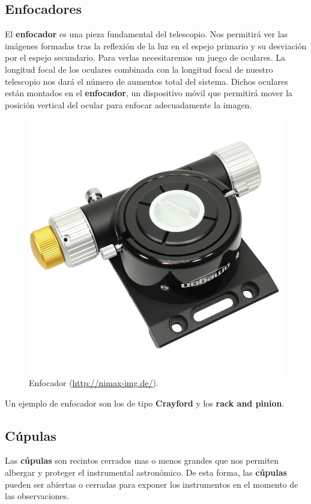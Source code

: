 \subsection{Enfocadores}

El \textbf{enfocador} es una pieza fundamental del telescopio. Nos permitirá ver las imágenes formadas tras la reflexión de la luz en el espejo primario y su desviación por el espejo secundario. Para verlas necesitaremos un juego de oculares. La longitud focal de los oculares combinada con la longitud focal de nuestro telescopio nos dará el número de aumentos total del sistema. Dichos oculares están montados en el \textbf{enfocador}, un dispositivo móvil que permitirá mover la posición vertical del ocular para enfocar adecuadamente la imagen.

\bigskip
\begin{figure}[!ht]
  \begin{center}
  \includegraphics[width=1\textwidth]{../images/enfocador.jpg}
  \caption{Enfocador (\url{http://nimax-img.de/}).}
  \label{fig:diag_scrum}
  \end{center}
\end{figure}

\bigskip
Un ejemplo de enfocador son los de tipo \textbf{Crayford} y los \textbf{rack and pinion}.

\subsection{Cúpulas}
Las \textbf{cúpulas} son recintos cerrados mas o menos grandes que nos permiten albergar y proteger el instrumental astronómico. De esta forma, las \textbf{cúpulas} pueden ser abiertas o cerradas para exponer los instrumentos en el momento de las observaciones.

